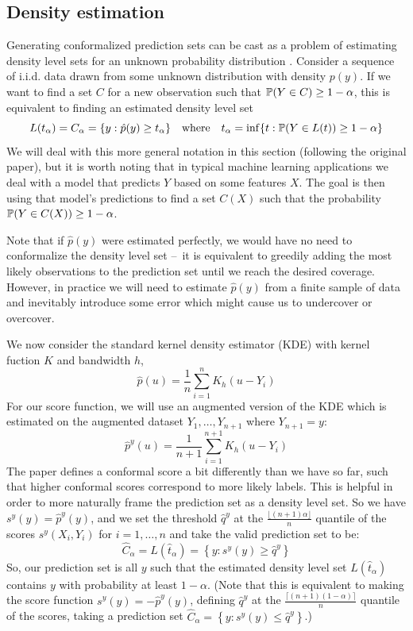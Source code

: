 \documentclass[a4paper, 12pt]{article}
\begin{document}
\subsection{Density estimation}
\label{sec:density}
Generating conformalized prediction sets can be cast as a problem of estimating
density level sets for an unknown probability distribution \autocite{leiDistributionFreePrediction2013}.
Consider a sequence of i.i.d. data drawn from some unknown distribution with density $p(y)$.
If we want to find a set $C$ for a new observation such that
$\P(Y \in C) \geq 1 - \alpha$, this is equivalent to finding an estimated density level set
\[L(t_\alpha)=C_\alpha=\{y: \hat{p}(y) \geq t_\alpha\} \quad \text{where} \quad t_\alpha = \inf \{t: \P(Y \in L(t)) \geq 1 - \alpha\}\]
We will deal with this more general notation in this section (following the original paper), but it is worth noting that in typical machine learning applications we deal with a model that predicts $Y$ based on some features $X$. The goal is then using that model's predictions to find a set $C(X)$ such that the probability $\P(Y \in C(X) ) \geq 1 - \alpha$.

Note that if $\hat{p}(y)$ were estimated perfectly, we would have no need to conformalize the density level set --\
it is equivalent to greedily adding the most likely observations to the prediction set until we reach the desired coverage.
However, in practice we will need to estimate $\hat{p}(y)$ from a finite sample
of data and inevitably introduce some error which might cause us to undercover or overcover.

We now consider the standard kernel density estimator (KDE) with kernel fuction $K$ and bandwidth $h$,
\[\hat{p}(u) = \frac{1}{n} \sum_{i=1}^n K_h(u-Y_i) \]
For our score function, we will use an augmented version of the KDE which is estimated on the augmented dataset $Y_1, \ldots, Y_{n+1}$ where $Y_{n+1}= y$:
\[ \hat{p}^y(u) = \frac{1}{n+1} \sum_{i=1}^{n+1} K_h(u-Y_i) \]
The paper defines a conformal score a bit differently than we have so far, such that higher conformal scores correspond to more likely labels. This is helpful in order to more naturally frame the prediction set as a density level set. So we have $s^y(y) = \hat{p}^y(y)$, and we set the threshold $\hat{q}^y$ at the $ \frac{\lfloor (n+1)\alpha \rfloor }{n}$ quantile of the scores $s^y(X_i, Y_i)$ for $i = 1, \ldots, n$ and take the valid prediction set to be:
\[ \hat{C}_\alpha = L(\hat{t}_\alpha) = \left\{ y: s^y(y) \geq \hat{q}^y \right\} \]
So, our prediction set is all $y$ such that the estimated density level set $L(\hat{t}_\alpha)$ contains $y$ with probability at least $1-\alpha$. (Note that this is equivalent to making the score function $s^y(y)=-\hat{p}^y(y)$, defining $\hat{q}^y$ at the $ \frac{\lceil (n+1)(1-\alpha) \rceil }{n}$ quantile of the scores, taking a prediction set $\hat{C}_\alpha = \left\{ y : s^y(y)\leq \hat{q}^y \right\}$.)
\end{document}
